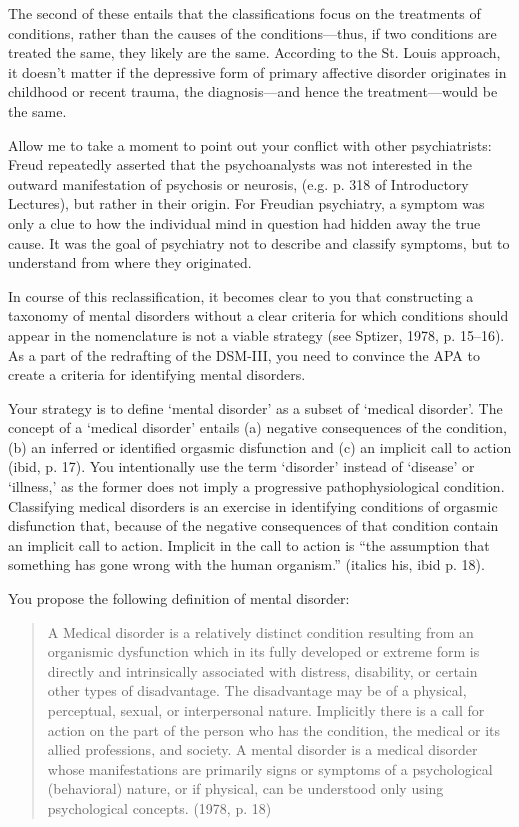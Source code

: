 The second of these entails that the classifications focus on the treatments of conditions, rather than the causes of the conditions---thus, if two conditions are treated the same, they likely are the same. According to the St. Louis approach, it doesn't matter if the depressive form of primary affective disorder originates in childhood or recent trauma, the diagnosis---and hence the treatment---would be the same.

Allow me to take a moment to point out your conflict with other psychiatrists: Freud repeatedly asserted that the psychoanalysts was not interested in the outward manifestation of psychosis or neurosis, (e.g. p. 318 of Introductory Lectures), but rather in their origin. For Freudian psychiatry, a symptom was only a clue to how the individual mind in question had hidden away the true cause. It was the goal of psychiatry not to describe and classify symptoms, but to understand from where they originated.

In course of this reclassification, it becomes clear to you that constructing a taxonomy of mental disorders without a clear criteria for which conditions should appear in the nomenclature is not a viable strategy (see Sptizer, 1978, p. 15--16). As a part of the redrafting of the DSM-III, you need to convince the APA to create a criteria for identifying mental disorders. 

Your strategy is to define `mental disorder' as a subset of `medical disorder'. The concept of a `medical disorder' entails (a) negative consequences of the condition, (b) an inferred or identified orgasmic disfunction and (c) an implicit call to action (ibid, p. 17). You intentionally use the term `disorder' instead of `disease' or `illness,' as the former does not imply a progressive pathophysiological condition. Classifying medical disorders is an exercise in identifying conditions of orgasmic disfunction that, because of the negative consequences of that condition contain an implicit call to action. Implicit in the call to action is ``the assumption that something has gone wrong with the human organism.'' (italics his, ibid p. 18).

You propose the following definition of mental disorder:

\begin{quote}

A Medical disorder is a relatively distinct condition resulting from an organismic dysfunction which in its fully developed or extreme form is directly and intrinsically associated with distress, disability, or certain other types of disadvantage. The disadvantage may be of a physical, perceptual, sexual, or interpersonal nature. Implicitly there is a call for action on the part of the person who has the condition, the medical or its allied professions, and society.
A mental disorder is a medical disorder whose manifestations are primarily signs or symptoms of a psychological (behavioral) nature, or if physical, can be understood only using psychological concepts. (1978, p. 18)
\end{quote}

